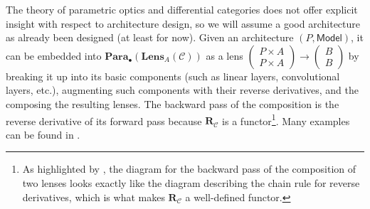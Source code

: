 \documentclass[11pt,a4paper,openright,twoside]{report}
\theoremstyle{plain}
\theoremstyle{definition}
\begin{document}
The theory of parametric optics and differential categories does not offer explicit insight with respect to architecture design, so we will assume a good architecture as already been designed (at least for now). Given an architecture $(P,\mathsf{Model})$, it can be embedded into $\mathbf{Para}_{\bullet}(\mathbf{Lens}_A(\mathcal{C}))$ as a lens $\left(\begin{smallmatrix} P \times A \\ P \times A \end{smallmatrix}\right) \to \left(\begin{smallmatrix} B \\ B \end{smallmatrix}\right)$ by breaking it up into its basic components (such as linear layers, convolutional layers, etc.), augmenting such components with their reverse derivatives, and the composing the resulting lenses. The backward pass of the composition is the reverse derivative of its forward pass because $\mathbf{R}_{\mathcal{C}}$ is a functor\footnote{As highlighted by \cite{shiebler2021category}, the diagram for the backward pass of the composition of two lenses looks exactly like the diagram describing the chain rule for reverse derivatives, which is what makes $\mathbf{R}_{\mathcal{C}}$ a well-defined functor.}. Many examples can be found in \cite{cruttwell2022categorical}.
\end{document}
